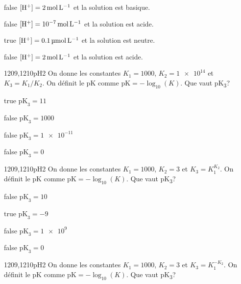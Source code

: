         \begin{reponses}
    	    \item[false] $\text{[H\textsuperscript{+}]} = \SI{2}{\mol\per\liter}$ et la solution est basique.
    	    \item[false] $\text{[H\textsuperscript{+}]} = \SI{e-7}{\mol\per\liter}$ et la solution est acide.
    	    \item[true] $\text{[H\textsuperscript{+}]} = \SI{0.1}{\micro\mol\per\liter}$ et la solution est neutre.
    	    \item[false] $\text{[H\textsuperscript{+}]} = \SI{2}{\mol\per\liter}$ et la solution est acide.
        \end{reponses}
        \begin{question}{1209,1210}{pH}{2}{}
			On donne les constantes $K_1 = 1000$, $K_2 = \num{1e14}$ et $K_3 = K_1/K_2$. On définit le pK comme $\text{pK} = -\log_{10}\left(K\right)$. Que vaut pK\textsubscript{3}?
        \end{question}
        \begin{reponses}
    	    \item[true] $\text{pK}_3 = 11$
    	    \item[false] $\text{pK}_3 = 1000$
    	    \item[false] $\text{pK}_3 = \num{1e-11}$
    	    \item[false] $\text{pK}_3 = 0$
        \end{reponses}
        \begin{question}{1209,1210}{pH}{2}{}
			On donne les constantes $K_1 = 1000$, $K_2 = 3$ et $K_3 = K_1^{K_2}$. On définit le pK comme $\text{pK} = -\log_{10}\left(K\right)$. Que vaut pK\textsubscript{3}?
        \end{question}
        \begin{reponses}
    	    \item[false] $\text{pK}_3 = 10$    
    	    \item[true] $\text{pK}_3 = -9$
    	    \item[false] $\text{pK}_3 = \num{1e9}$
    	    \item[false] $\text{pK}_3 = 0$
        \end{reponses}
        \begin{question}{1209,1210}{pH}{2}{}
			On donne les constantes $K_1 = 1000$, $K_2 = 3$ et $K_3 = K_1^{-K_2}$. On définit le pK comme $\text{pK} = -\log_{10}\left(K\right)$. Que vaut pK\textsubscript{3}?
        \end{question}

